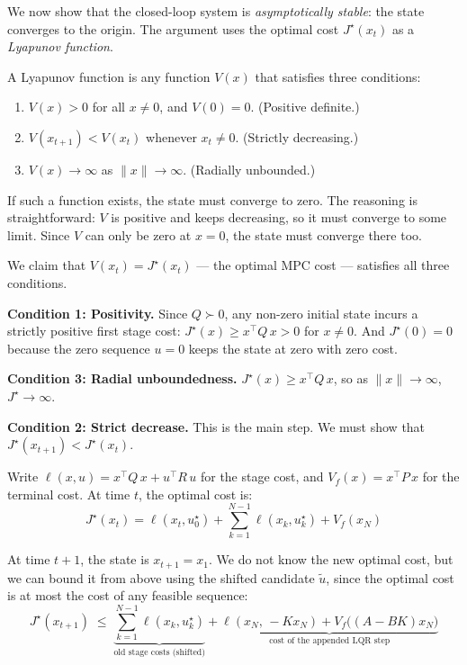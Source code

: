 We now show that the closed-loop system is \emph{asymptotically stable}: the state converges to the origin. The argument uses the optimal cost $J^\star(x_t)$ as a \emph{Lyapunov function}.

A Lyapunov function is any function $V(x)$ that satisfies three conditions:
\begin{enumerate}[noitemsep]
	\item $V(x) > 0$ for all $x \ne 0$, and $V(0) = 0$. \hfill (Positive definite.)
	\item $V(x_{t+1}) < V(x_t)$ whenever $x_t \ne 0$. \hfill (Strictly decreasing.)
	\item $V(x) \to \infty$ as $\|x\| \to \infty$. \hfill (Radially unbounded.)
\end{enumerate}
If such a function exists, the state must converge to zero. The reasoning is straightforward: $V$ is positive and keeps decreasing, so it must converge to some limit. Since $V$ can only be zero at $x = 0$, the state must converge there too.

We claim that $V(x_t) = J^\star(x_t)$ --- the optimal MPC cost --- satisfies all three conditions.

\textbf{Condition 1: Positivity.}
Since $Q \succ 0$, any non-zero initial state incurs a strictly positive first stage cost: $J^\star(x) \ge x^\top Q\, x > 0$ for $x \ne 0$. And $J^\star(0) = 0$ because the zero sequence $u = 0$ keeps the state at zero with zero cost.

\textbf{Condition 3: Radial unboundedness.}
$J^\star(x) \ge x^\top Q\, x$, so as $\|x\| \to \infty$, $J^\star \to \infty$.

\textbf{Condition 2: Strict decrease.}
This is the main step. We must show that $J^\star(x_{t+1}) < J^\star(x_t)$.

Write $\ell(x,u) = x^\top Q\, x + u^\top R\, u$ for the stage cost, and $V_f(x) = x^\top P\, x$ for the terminal cost. At time $t$, the optimal cost is:
\[
J^\star(x_t) = \ell(x_t, u_0^\star) + \sum_{k=1}^{N-1} \ell(x_k, u_k^\star) + V_f(x_N)
\]

At time $t+1$, the state is $x_{t+1} = x_1$. We do not know the new optimal cost, but we can bound it from above using the shifted candidate $\tilde{u}$, since the optimal cost is at most the cost of any feasible sequence:
\[
J^\star(x_{t+1}) \;\le\; \underbrace{\sum_{k=1}^{N-1} \ell(x_k, u_k^\star)}_{\text{old stage costs (shifted)}} + \underbrace{\ell(x_N,\, -Kx_N) + V_f\bigl((A-BK)x_N\bigr)}_{\text{cost of the appended LQR step}}
\]

